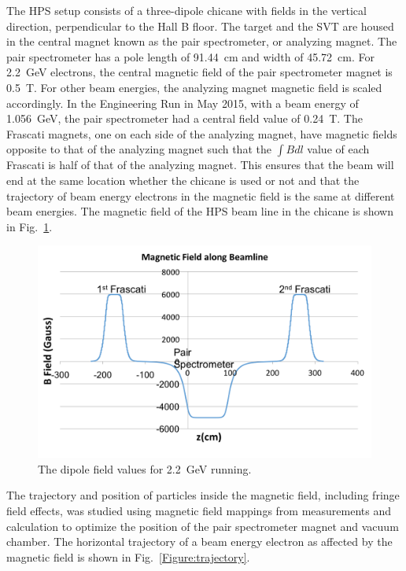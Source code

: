The HPS setup consists of a three-dipole chicane with fields in the vertical direction, perpendicular to the Hall B floor. The target and the SVT are housed in the central magnet known as the pair spectrometer, or analyzing magnet. The pair spectrometer has a pole length of 91.44~cm and width of 45.72~cm. For 2.2~GeV electrons, the central magnetic field of the pair spectrometer magnet is 0.5~T. For other beam energies, the analyzing magnet magnetic field is scaled accordingly. In the Engineering Run in May 2015, with a beam energy of 1.056~GeV, the pair spectrometer had a central field value of 0.24~T. The Frascati magnets, one on each side of the analyzing magnet, have magnetic fields opposite to that of the analyzing magnet such that the $\int B dl$ value of each Frascati is half of that of the analyzing magnet. This ensures that the beam will end at the same location whether the chicane is used or not and that the trajectory of beam energy electrons in the magnetic field is the same at different beam energies. The magnetic field of the HPS beam line in the chicane is shown in Fig.~\ref{Figure:bField}.

\begin{figure}[H]
  \centering
      \includegraphics[width=1.0\textwidth]{pics/experiment/bfield.png}
  \caption[HPS magnetic fields]{The dipole field values for 2.2~GeV running.}
  \label{Figure:bField}
\end{figure}

The trajectory and position of particles inside the magnetic field, including fringe field effects, was studied using magnetic field mappings from measurements and calculation to optimize the position of the pair spectrometer magnet and vacuum chamber. The horizontal trajectory of a beam energy electron as affected by the magnetic field is shown in Fig.~\ref{Figure:trajectory}.

